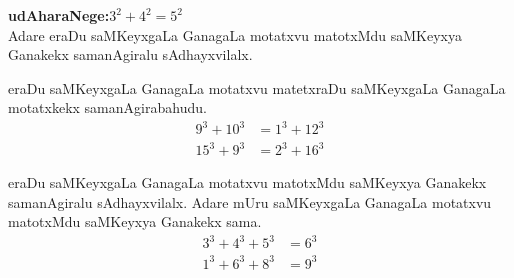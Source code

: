 \textbf{udAharaNege:}\qquad\qquad $3^2+4^2 = 5^2$\\
Adare eraDu saMKeyxgaLa GanagaLa motatxvu matotxMdu saMKeyxya Ganakekx samanAgiralu sAdhayxvilalx.

eraDu saMKeyxgaLa GanagaLa motatxvu matetxraDu saMKeyxgaLa GanagaLa motatxkekx samanAgirabahudu.
\begin{align*}
9^3+10^3 &= 1^3+12^3\\
15^3+9^3 &= 2^3+16^3
\end{align*}

eraDu saMKeyxgaLa GanagaLa motatxvu matotxMdu saMKeyxya Ganakekx samanAgiralu sAdhayxvilalx. Adare mUru saMKeyxgaLa GanagaLa motatxvu matotxMdu saMKeyxya Ganakekx sama.
\begin{align*}
3^3+4^3+5^3 &= 6^3\\
1^3+6^3+8^3 &= 9^3
\end{align*}



